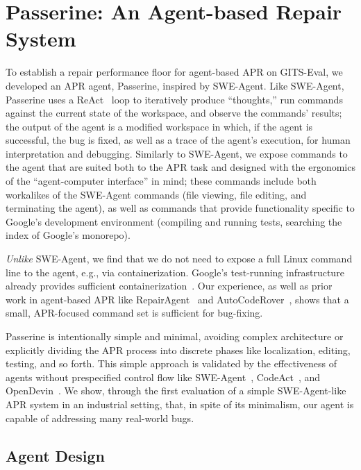 \section{Passerine: An Agent-based Repair System}
\label{sec:passerine}


To establish a repair performance floor for agent-based APR on GITS-Eval, we developed an APR agent, Passerine, inspired by SWE-Agent.
Like SWE-Agent, Passerine uses a ReAct~\cite{react} loop to iteratively produce ``thoughts,'' run commands against the current state of the workspace, and observe the commands' results; the output of the agent is a modified workspace in which, if the agent is successful, the bug is fixed, as well as a trace of the agent's execution, for human interpretation and debugging.
Similarly to SWE-Agent, we expose commands to the agent that are suited both to the APR task and designed with the ergonomics of the ``agent-computer interface'' in mind; these commands include both workalikes of the SWE-Agent commands (file viewing, file editing, and terminating the agent), as well as commands that provide functionality specific to Google's development environment (compiling and running tests, searching the index of Google's monorepo).

\emph{Unlike} SWE-Agent, we find that we do not need to expose a full Linux command line to the agent, e.g., via containerization.
Google's test-running infrastructure already provides sufficient containerization~\cite{potvingoogle}. Our experience, as well as prior work in agent-based APR like RepairAgent~\cite{repairagent} and AutoCodeRover~\cite{autocoderover}, shows that a small, APR-focused command set is sufficient for bug-fixing.

Passerine is intentionally simple and minimal, avoiding complex architecture or explicitly dividing the APR process into discrete phases like localization, editing, testing, and so forth.
This simple approach is validated by the effectiveness of agents without prespecified control flow like SWE-Agent~\cite{sweagent}, CodeAct~\cite{codeact}, and OpenDevin~\cite{opendevin}.
We show, through the first evaluation of a simple SWE-Agent-like APR system in an industrial setting, that, in spite of its minimalism, our agent is capable of addressing many real-world bugs.










\subsection{Agent Design}

